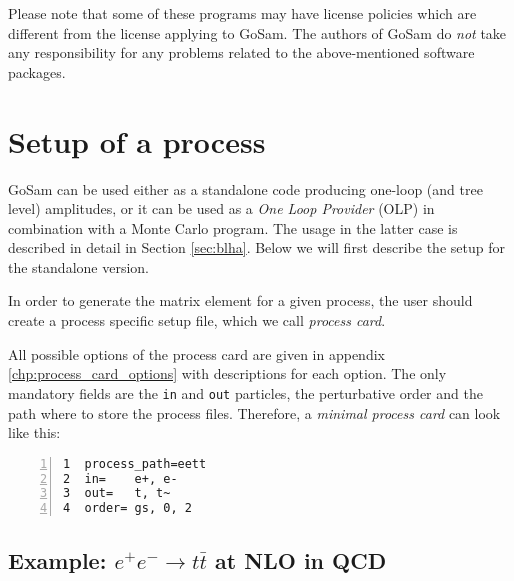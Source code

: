 \documentclass[11pt,a4paper]{refrep}
\newcommand{\gosamversion}{{3{.}0}}
\newcommand{\gosam}{{\sc GoSam}\xspace}
\newcommand{\gosamv}[1][\gosamversion]{{\sc GoSam}\xspace}
\begin{document}
\attention Please note that some of these programs may have
license policies which are different from the license
applying to \gosamv. The authors of \gosamv do \emph{not}
take any responsibility for any problems related to the
above-mentioned software packages.



\chapter{Setup of a process}
\label{chp:setup-of-a-process}


\gosam{} can be used either as a standalone code producing one-loop 
(and tree level) amplitudes, or it can be used as a {\it One Loop Provider} (OLP)
in combination with a Monte Carlo program. 
The usage in the latter case is described in detail in Section \ref{sec:blha}. 
Below we will first describe the setup for the standalone version.


In order to generate the matrix element for a given process, the user should
create a process specific setup file, which we call {\em process card}. 


All possible options of the process card are given in appendix \ref{chp:process_card_options} with descriptions for each option.
The only mandatory fields are the {\tt in} and {\tt out} 
particles, the perturbative order and the path where to store the process files.
Therefore, a {\em minimal process card} can look like this:
\begin{lstlisting}[gobble=3,%
     numbers=left,caption={{\tt eett.in}},%
     basicstyle=\ttfamily]
1  process_path=eett
2  in=    e+, e-
3  out=   t, t~
4  order= gs, 0, 2
\end{lstlisting}


\section{Example: \texorpdfstring{$e^+e^-\rightarrow t\bar{t}$}{e+e- to tt-bar}
at NLO in QCD}
\end{document}
